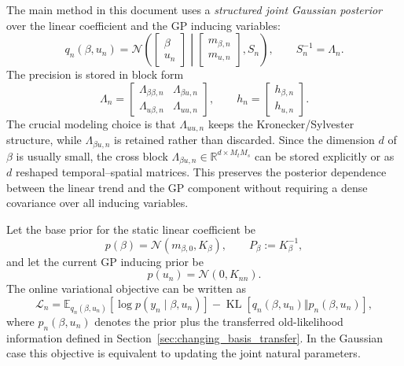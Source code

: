 \documentclass[12pt]{article}
\newcommand{\E}{\mathbb{E}}
\newcommand{\KL}{\operatorname{KL}}
\begin{document}
The main method in this document uses a \emph{structured joint Gaussian posterior}
over the linear coefficient and the GP inducing variables:
\begin{equation}
    q_n(\beta,u_n)
    =
    \mathcal{N}
    \left(
    \begin{bmatrix}\beta\\u_n\end{bmatrix}
    \middle|
    \begin{bmatrix}m_{\beta,n}\\m_{u,n}\end{bmatrix},
    S_n
    \right),
    \qquad
    S_n^{-1}=\Lambda_n .
    \label{eq:structured-joint-posterior}
\end{equation}
The precision is stored in block form
\begin{equation}
    \Lambda_n
    =
    \begin{bmatrix}
        \Lambda_{\beta\beta,n} & \Lambda_{\beta u,n}\\
        \Lambda_{u\beta,n} & \Lambda_{uu,n}
    \end{bmatrix},
    \qquad
    h_n=
    \begin{bmatrix}
        h_{\beta,n}\\h_{u,n}
    \end{bmatrix}.
    \label{eq:structured-joint-precision}
\end{equation}
The crucial modeling choice is that $\Lambda_{uu,n}$ keeps the
Kronecker/Sylvester structure, while $\Lambda_{\beta u,n}$ is retained rather
than discarded. Since the dimension $d$ of $\beta$ is usually small, the
cross block $\Lambda_{\beta u,n}\in\mathbb{R}^{d\times M_tM_s}$ can be stored
explicitly or as $d$ reshaped temporal--spatial matrices. This preserves the
posterior dependence between the linear trend and the GP component without
requiring a dense covariance over all inducing variables.

Let the base prior for the static linear coefficient be
\begin{equation}
    p(\beta)=\mathcal{N}(m_{\beta,0},K_\beta),
    \qquad
    P_\beta:=K_\beta^{-1},
\end{equation}
and let the current GP inducing prior be
\begin{equation}
    p(u_n)=\mathcal{N}(0,K_{nn}).
\end{equation}
The online variational objective can be written as
\begin{equation}
    \mathcal{L}_n
    =
    \E_{q_n(\beta,u_n)}
    \left[
        \log p(y_n\mid \beta,u_n)
    \right]
    -
    \KL
    \left[
        q_n(\beta,u_n)
        \Vert
        p_n(\beta,u_n)
    \right],
    \label{eq:structured-joint-elbo}
\end{equation}
where $p_n(\beta,u_n)$ denotes the prior plus the transferred old-likelihood
information defined in Section~\ref{sec:changing_basis_transfer}. In the
Gaussian case this objective is equivalent to updating the joint natural
parameters.
\end{document}
